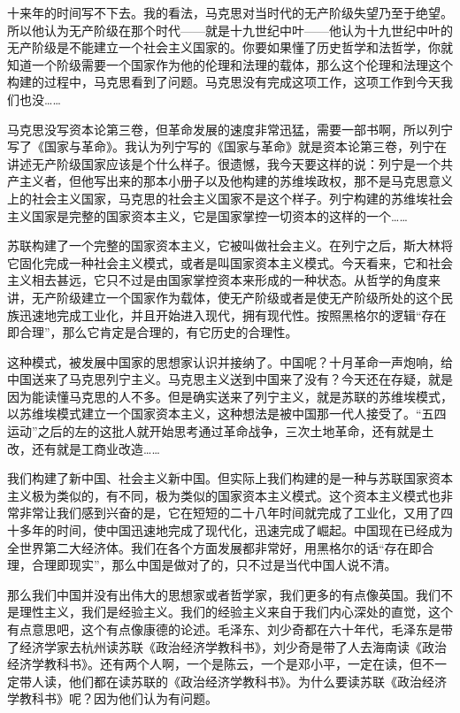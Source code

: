 \documentclass[UTF8, 12pt, a4paper]{ctexrep}
\begin{document}
十来年的时间写不下去。我的看法，马克思对当时代的无产阶级失望乃至于绝望。所以他认为无产阶级在那个时代——就是十九世纪中叶——他认为十九世纪中叶的无产阶级是不能建立一个社会主义国家的。你要如果懂了历史哲学和法哲学，你就知道一个阶级需要一个国家作为他的伦理和法理的载体，那么这个伦理和法理这个构建的过程中，马克思看到了问题。马克思没有完成这项工作，这项工作到今天我们也没……

马克思没写资本论第三卷，但革命发展的速度非常迅猛，需要一部书啊，所以列宁写了《国家与革命》。我认为列宁写的《国家与革命》就是资本论第三卷，列宁在讲述无产阶级国家应该是个什么样子。很遗憾，我今天要这样的说：列宁是一个共产主义者，但他写出来的那本小册子以及他构建的苏维埃政权，那不是马克思意义上的社会主义国家，马克思的社会主义国家不是这个样子。列宁构建的苏维埃社会主义国家是完整的国家资本主义，它是国家掌控一切资本的这样的一个……

苏联构建了一个完整的国家资本主义，它被叫做社会主义。在列宁之后，斯大林将它固化完成一种社会主义模式，或者是叫国家资本主义模式。今天看来，它和社会主义相去甚远，它只不过是由国家掌控资本来形成的一种状态。从哲学的角度来讲，无产阶级建立一个国家作为载体，使无产阶级或者是使无产阶级所处的这个民族迅速地完成工业化，并且开始进入现代，拥有现代性。按照黑格尔的逻辑“存在即合理”，那么它肯定是合理的，有它历史的合理性。

这种模式，被发展中国家的思想家认识并接纳了。中国呢？十月革命一声炮响，给中国送来了马克思列宁主义。马克思主义送到中国来了没有？今天还在存疑，就是因为能读懂马克思的人不多。但是确实送来了列宁主义，就是苏联的苏维埃模式，以苏维埃模式建立一个国家资本主义，这种想法是被中国那一代人接受了。“五四运动”之后的左的这批人就开始思考通过革命战争，三次土地革命，还有就是土改，还有就是工商业改造……

我们构建了新中国、社会主义新中国。但实际上我们构建的是一种与苏联国家资本主义极为类似的，有不同，极为类似的国家资本主义模式。这个资本主义模式也非常非常让我们感到兴奋的是，它在短短的二十八年时间就完成了工业化，又用了四十多年的时间，使中国迅速地完成了现代化，迅速完成了崛起。中国现在已经成为全世界第二大经济体。我们在各个方面发展都非常好，用黑格尔的话“存在即合理，合理即现实”，那么中国是做对了的，只不过是当代中国人说不清。

那么我们中国并没有出伟大的思想家或者哲学家，我们更多的有点像英国。我们不是理性主义，我们是经验主义。我们的经验主义来自于我们内心深处的直觉，这个有点意思吧，这个有点像康德的论述。毛泽东、刘少奇都在六十年代，毛泽东是带了经济学家去杭州读苏联《政治经济学教科书》，刘少奇是带了人去海南读《政治经济学教科书》。还有两个人啊，一个是陈云，一个是邓小平，一定在读，但不一定带人读，他们都在读苏联的《政治经济学教科书》。为什么要读苏联《政治经济学教科书》呢？因为他们认为有问题。
\end{document}
